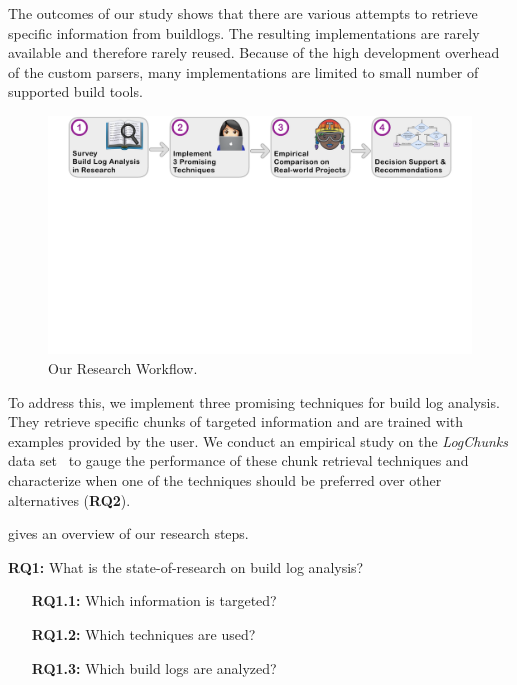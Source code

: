 The outcomes of our study shows that there are various attempts to
retrieve specific information from buildlogs.
The resulting implementations are rarely available and therefore rarely
reused.
Because of the high development overhead
of the custom parsers, many implementations are limited to small number
of supported build tools.

\begin{figure}[htb]
	\centering
	\includegraphics[width=\textwidth, trim={1.2cm 10.5cm 1.2cm 0cm},
	clip]{img/overview.pdf}
	\caption{Our Research Workflow.}
	\label{fig:overview}
\end{figure}

To address this, we implement three promising techniques for build
log analysis.
They retrieve specific chunks of targeted information and are trained
with examples provided by the user.
We conduct an empirical study on the \emph{LogChunks} data
set~\cite{brandt2020logchunks} to
gauge the performance of these chunk retrieval techniques and characterize
when one of the techniques should be preferred over other alternatives
(\textbf{RQ2}).

 gives an overview of our research steps.

\begin{simplebox}{\textbf{RQ1:} What is the state-of-research on build
log analysis?}
\begin{itemize}
  \item[\textbf{RQ1.1:}] Which information is targeted?
  \item[\textbf{RQ1.2:}] Which techniques are used?
  \item[\textbf{RQ1.3:}] Which build logs are analyzed?
\end{itemize}
\end{simplebox}

